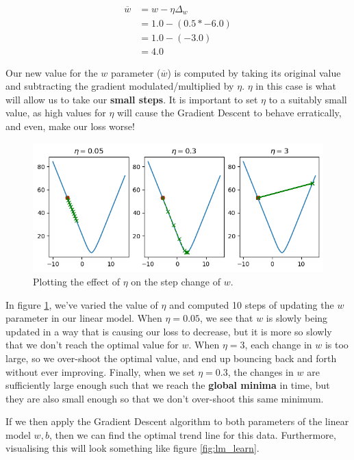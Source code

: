 \documentclass[10pt]{beamer}
\begin{document}
\[\begin{aligned}
\overline{w} &= w - \eta \Delta_w \\
&= 1.0 - (0.5 * -6.0) \\
&= 1.0 - (-3.0) \\
&= 4.0
\end{aligned}\]

Our new value for the \(w\) parameter (\(\overline{w}\)) is computed by taking its
original value and subtracting the gradient modulated/multiplied by \(\eta\). \(\eta\) in
this case is what will allow us to take our \textbf{small steps}. It is important to set
\(\eta\) to a suitably small value, as high values for \(\eta\) will cause the Gradient
Descent to behave erratically, and even, make our loss worse!

\begin{figure}[htbp]
\centering
\includegraphics[width=.9\linewidth]{images/small_step_eta.png}
\caption{\label{fig:eta}Plotting the effect of \(\eta\) on the step change of \(w\).}
\end{figure}

In figure \ref{fig:eta}, we've varied the value of \(\eta\) and computed 10 steps of updating
the \(w\) parameter in our linear model. When \(\eta=0.05\), we see that \(w\) is slowly
being updated in a way that is causing our loss to decrease, but it is more so slowly
that we don't reach the optimal value for \(w\). When \(\eta=3\), each change in \(w\) is
too large, so we over-shoot the optimal value, and end up bouncing back and forth
without ever improving. Finally, when we set \(\eta=0.3\), the changes in \(w\) are
sufficiently large enough such that we reach the \textbf{global minima} in time, but they are
also small enough so that we don't over-shoot this same minimum.

If we then apply the Gradient Descent algorithm to both parameters of the linear
model \(w, b\), then we can find the optimal trend line for this data. Furthermore,
visualising this will look something like figure \ref{fig:lm_learn}.
\end{document}
